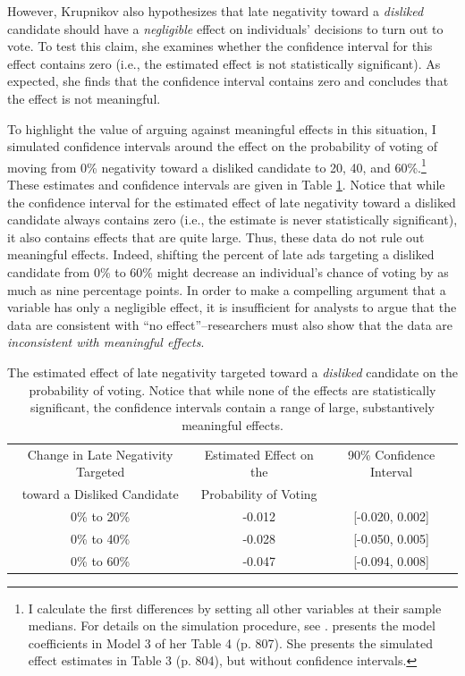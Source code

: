 \documentclass[12pt]{article}
\begin{document}
However, Krupnikov also hypothesizes that late negativity toward a \textit{disliked} candidate should have a \textit{negligible} effect on individuals' decisions to turn out to vote. To test this claim, she examines whether the confidence interval for this effect contains zero (i.e., the estimated effect is not statistically significant). As expected, she finds that the confidence interval contains zero and concludes that the effect is not meaningful.

To highlight the value of arguing against meaningful effects in this situation, I simulated confidence intervals around the effect on the probability of voting of moving from 0\% negativity toward a disliked candidate to 20, 40, and 60\%.\footnote{I calculate the first differences by setting all other variables at their sample medians. For details on the simulation procedure, see \cite{KingTomzWhittenburg2000}. \cite{Krupnikov2011} presents the model coefficients in Model 3 of her Table 4 (p. 807). She presents the simulated effect estimates in Table 3 (p. 804), but without confidence intervals.} These estimates and confidence intervals are given in Table \ref{tab:krup}. Notice that while the confidence interval for the estimated effect of late negativity toward a disliked candidate always contains zero (i.e., the estimate is never statistically significant), it also contains effects that are quite large. Thus, these data do not rule out meaningful effects. Indeed, shifting the percent of late ads targeting a disliked candidate from 0\% to 60\% might decrease an individual's chance of voting by as much as nine percentage points. In order to make a compelling argument that a variable has only a negligible effect, it is insufficient for analysts to argue that the data are consistent with ``no effect''--researchers must also show that the data are \textit{inconsistent with meaningful effects}. 

\begin{table}
\begin{center}
\begin{tabular}{|ccc|}
\hline
Change in Late Negativity Targeted & Estimated Effect on the & 90\% Confidence Interval \\ 
toward a Disliked Candidate & Probability of Voting &  \\ 
\hline
0\% to 20\% & -0.012 & [-0.020, 0.002] \\ 
0\% to 40\% & -0.028 & [-0.050, 0.005] \\ 
0\% to 60\% &  -0.047& [-0.094, 0.008] \\ 
\hline
\end{tabular}\caption{The estimated effect of late negativity targeted toward a \textit{disliked} candidate on the probability of voting. Notice that while none of the effects are statistically significant, the confidence intervals contain a range of large, substantively meaningful effects.}\label{tab:krup}
\end{center}
\end{table}
\end{document}
